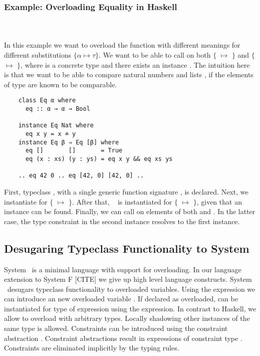 \subsubsection{Example: Overloading Equality in Haskell}\hfill\\\\
In this example we want to overload the function  with different meanings for different substitutions $\{α \mapsto τ\}$.
We want to be able to call  on both $\{$ $\mapsto$ $\}$ and $\{$ $\mapsto$ \inl{[β]}$\}$, where  is a concrete type and there exists an instance . The intuition here is that we want to be able to compare natural numbers  and lists \mono{[β]}, if the elements of type  are known to be comparable.
\begin{verbatim}
    class Eq α where
      eq :: α → α → Bool 

    instance Eq Nat where
      eq x y = x ≐ y
    instance Eq β ⇒ Eq [β] where
      eq []       []       = True
      eq (x : xs) (y : ys) = eq x y && eq xs ys 

    .. eq 42 0 .. eq [42, 0] [42, 0] ..
\end{verbatim}
First, typeclass , with a single generic function signature , is declared. Next, we instantiate  for $\{$ $\mapsto$ $\}$. 
After that, \  is instantiated for $\{$ $\mapsto$ \inl{[β]}$\}$, given that an instance  can be found.
Finally, we can call  on elements of both  and \inl{[Nat]}. In the latter case, the type constraint  in the second instance resolves to the first instance.

\subsection{Desugaring Typeclass Functionality to System \Fo}
System \Fo\ is a minimal language with support for overloading. 
In our language extension to System F [CITE] we give up high level language constructs. 
System \Fo\ desugars typeclass functionality to overloaded variables. 
Using the  expression we can introduce an new overloaded variable . 
If declared as overloaded,  can be instantiated for type  of expression  using the  expression.
In contrast to Haskell, we allow to overload  with arbitrary types. 
Locally shadowing other instances of the same type is allowed.
Constraints can be introduced using the constraint abstraction . Constraint abstractions result in expressions of constraint type . 
Constraints are eliminated implicitly by the typing rules.

